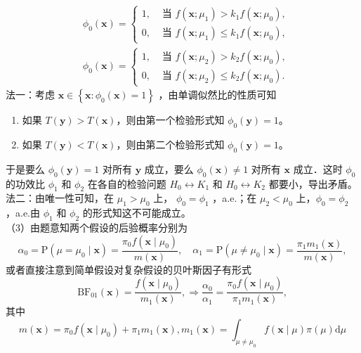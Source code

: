 \documentclass[UTF8]{ctexart}
\begin{document}
$$
\begin{aligned}
	& \phi_0(\boldsymbol{x})= \begin{cases}1, & \text { 当 } f\left(\boldsymbol{x} ; \mu_1\right)>k_1 f\left(\boldsymbol{x} ; \mu_0\right), \\
		0, & \text { 当 } f\left(\boldsymbol{x} ; \mu_1\right) \leq k_1 f\left(\boldsymbol{x} ; \mu_0\right),\end{cases} \\
	& \phi_0(\boldsymbol{x})= \begin{cases}1, & \text { 当 } f\left(\boldsymbol{x} ; \mu_2\right)>k_2 f\left(\boldsymbol{x} ; \mu_0\right), \\
		0, & \text { 当 } f\left(\boldsymbol{x} ; \mu_2\right) \leq k_2 f\left(\boldsymbol{x} ; \mu_0\right) .\end{cases}
\end{aligned}
$$
法一：考虑 $\boldsymbol{x} \in\left\{\boldsymbol{x}: \phi_0(\boldsymbol{x})=1\right\}$ ，由单调似然比的性质可知
\begin{enumerate}[label=\textbf{\textbullet}]
	\item 如果 $T(\boldsymbol{y})>T(\boldsymbol{x})$，则由第一个检验形式知 $\phi_0(\boldsymbol{y})=1$。
	\item 如果 $T(\boldsymbol{y})<T(\boldsymbol{x})$，则由第二个检验形式知 $\phi_0(\boldsymbol{y})=1$。
\end{enumerate}
于是要么 $\phi_0(\boldsymbol{y})=1$ 对所有 $\boldsymbol{y}$ 成立，要么 $\phi_0(\boldsymbol{x}) \neq 1$ 对所有 $\boldsymbol{x}$ 成立．这时 $\phi_0$ 的功效比 $\phi_1$ 和 $\phi_2$ 在各自的检验问题 $H_0 \leftrightarrow K_1$ 和 $H_0 \leftrightarrow K_2$ 都要小，导出矛盾。\\
法二：由唯一性可知，在 $\mu_1>\mu_0$ 上， $\phi_0=\phi_1$ ，a.e.；在 $\mu_2<\mu_0$ 上，$\phi_0=\phi_2$ ，a.e.由 $\phi_1$ 和 $\phi_2$ 的形式知这不可能成立。\\
（3）由题意知两个假设的后验概率分别为
$$
\alpha_0=\mathrm{P}\left(\mu=\mu_0 \mid \boldsymbol{x}\right)=\frac{\pi_0 f\left(\boldsymbol{x} \mid \mu_0\right)}{m(\boldsymbol{x})}, \quad \alpha_1=\mathrm{P}\left(\mu \neq \mu_0 \mid \boldsymbol{x}\right)=\frac{\pi_1 m_1(\boldsymbol{x})}{m(\boldsymbol{x})},
$$
或者直接注意到简单假设对复杂假设的贝叶斯因子有形式
$$
\mathrm{BF}_{01}(\boldsymbol{x})=\frac{f\left(\boldsymbol{x} \mid \mu_0\right)}{m_1(\boldsymbol{x})}, \Longrightarrow \frac{\alpha_0}{\alpha_1}=\frac{\pi_0 f\left(\boldsymbol{x} \mid \mu_0\right)}{\pi_1 m_1(\boldsymbol{x})},
$$
其中 
$$m(\boldsymbol{x})=\pi_0 f\left(\boldsymbol{x} \mid \mu_0\right)+\pi_1 m_1(\boldsymbol{x}), m_1(\boldsymbol{x})=\int_{\mu \neq \mu_0} f(\boldsymbol{x} \mid \mu) \pi(\mu) \mathrm{d} \mu$$
\end{document}

